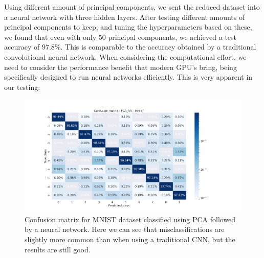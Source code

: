 \documentclass[onecolumn,10pt,cleanfoot]{asme2ej}
\begin{document}
Using different amount of principal components, we sent the reduced dataset into a neural network with three hidden layers. After testing different amounts of principal components to keep, and tuning the hyperparameters based on these, we found that even with only $50$ principal components, we achieved a test accuracy of $97.8\%$. This is comparable to the accuracy obtained by a traditional convolutional neural network. When considering the computational effort, we need to consider the performance benefit that modern GPU's bring, being specifically designed to run neural networks efficiently. This is very apparent in our testing: 


\begin{figure}[H]
\centerline{\includegraphics[width=8in]{figure/conf_pca_nn_MNIST.png}}
\caption{Confusion matrix for MNIST dataset classified using PCA followed by a neural network. Here we can see that misclassifications are slightly more common than when using a traditional CNN, but the results are still good.}
\label{mnistheatmap_pcann}
\end{figure}
\end{document}
